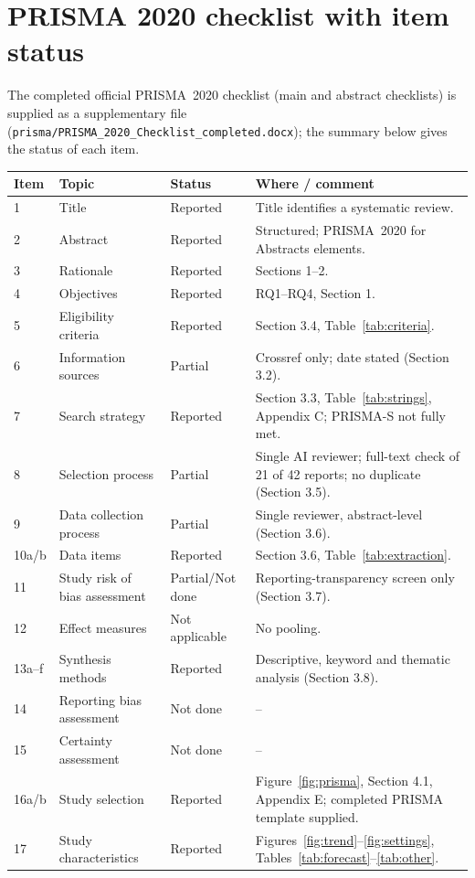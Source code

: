 \documentclass[11pt,a4paper]{article}
\begin{document}
\section{PRISMA 2020 checklist with item status}
The completed official PRISMA~2020 checklist (main and abstract checklists) is supplied as a supplementary file (\texttt{prisma/PRISMA\_2020\_Checklist\_completed.docx}); the summary below gives the status of each item.
\small
\begin{longtable}{@{}p{1.1cm}p{5.2cm}p{2.0cm}p{6.5cm}@{}}
\toprule
Item & Topic & Status & Where / comment\\
\midrule\endhead
1 & Title & Reported & Title identifies a systematic review.\\
2 & Abstract & Reported & Structured; PRISMA~2020 for Abstracts elements.\\
3 & Rationale & Reported & Sections 1--2.\\
4 & Objectives & Reported & RQ1--RQ4, Section 1.\\
5 & Eligibility criteria & Reported & Section 3.4, Table~\ref{tab:criteria}.\\
6 & Information sources & Partial & Crossref only; date stated (Section 3.2).\\
7 & Search strategy & Reported & Section 3.3, Table~\ref{tab:strings}, Appendix C; PRISMA-S not fully met.\\
8 & Selection process & Partial & Single AI reviewer; full-text check of 21 of 42 reports; no duplicate (Section 3.5).\\
9 & Data collection process & Partial & Single reviewer, abstract-level (Section 3.6).\\
10a/b & Data items & Reported & Section 3.6, Table~\ref{tab:extraction}.\\
11 & Study risk of bias assessment & Partial/Not done & Reporting-transparency screen only (Section 3.7).\\
12 & Effect measures & Not applicable & No pooling.\\
13a--f & Synthesis methods & Reported & Descriptive, keyword and thematic analysis (Section 3.8).\\
14 & Reporting bias assessment & Not done & --\\
15 & Certainty assessment & Not done & --\\
16a/b & Study selection & Reported & Figure~\ref{fig:prisma}, Section 4.1, Appendix E; completed PRISMA template supplied.\\
17 & Study characteristics & Reported & Figures~\ref{fig:trend}--\ref{fig:settings}, Tables~\ref{tab:forecast}--\ref{tab:other}.\\

\end{longtable}
\end{document}
